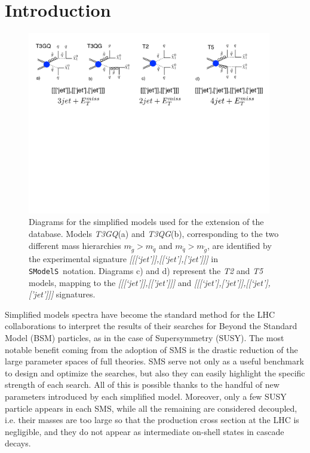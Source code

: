 \documentclass[preprint,number,sort&compress,twocolumn,3p]{elsstyarticle}
\newcommand{\SMO}{\texttt{SModelS\xspace}}
\begin{document}
\section{Introduction}
\begin{figure}
	\begin{center}
		\includegraphics[width=0.95\textwidth]{PLOTS/Diagrams_2}
	\end{center}
	\caption{Diagrams for the simplified models used for the extension of the database. Models \textit{T3GQ}(a) and \textit{T3QG}(b), corresponding to the two different mass hierarchies $m_{\tilde g} > m_{\tilde q}$ and $m_{\tilde q} > m_{\tilde g}$, are identified by the experimental signature \textit{[[[`jet']],[[`jet'],['jet']]]} in \SMO~notation. Diagrams c) and d) represent the \textit{T2} and \textit{T5} models, mapping to the \textit{[[[`jet']],[['jet']]]} and \textit{[[[`jet'],['jet']],[[`jet'],['jet']]]} signatures.}
	\label{Diagrams}
\end{figure}
Simplified models spectra have become the standard method for the LHC collaborations to interpret the results of their searches for Beyond the Standard Model (BSM) particles, as in the case of Supersymmetry (SUSY). The most notable benefit coming from the adoption of SMS is the drastic reduction of the large parameter spaces of full theories. SMS serve not only as a useful benchmark to design and optimize the searches, but also they can easily highlight the specific strength of each search. All of this is possible thanks to the handful of new parameters introduced by each simplified model. Moreover, only a few SUSY particle appears in each SMS, while all the remaining are considered decoupled, i.e. their masses are too large so that the production cross section at the LHC is negligible, and they do not appear as intermediate on-shell states in cascade decays. 
\end{document}
